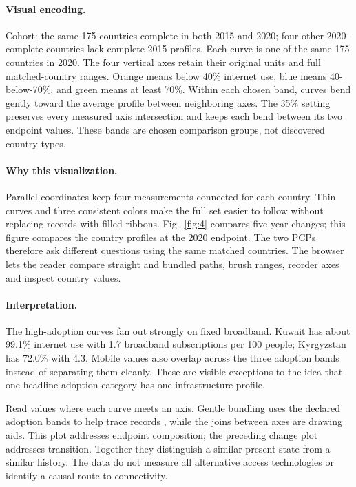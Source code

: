 \documentclass[conference,a4paper]{IEEEtran}
\begin{document}
\paragraph{Visual encoding.} Cohort: the same 175 countries complete in both 2015 and 2020; four other 2020-complete countries lack complete 2015 profiles. Each curve is one of the same 175 countries in 2020. The four vertical axes retain their original units and full matched-country ranges. Orange means below 40\% internet use, blue means 40-below-70\%, and green means at least 70\%. Within each chosen band, curves bend gently toward the average profile between neighboring axes. The 35\% setting preserves every measured axis intersection and keeps each bend between its two endpoint values. These bands are chosen comparison groups, not discovered country types.



\paragraph{Why this visualization.} Parallel coordinates keep four measurements connected for each country. Thin curves and three consistent colors make the full set easier to follow without replacing records with filled ribbons. Fig.~\ref{fig:4} compares five-year changes; this figure compares the country profiles at the 2020 endpoint. The two PCPs therefore ask different questions using the same matched countries. The browser lets the reader compare straight and bundled paths, brush ranges, reorder axes and inspect country values.



\paragraph{Interpretation.} The high-adoption curves fan out strongly on fixed broadband. Kuwait has about 99.1\% internet use with 1.7 broadband subscriptions per 100 people; Kyrgyzstan has 72.0\% with 4.3. Mobile values also overlap across the three adoption bands instead of separating them cleanly. These are visible exceptions to the idea that one headline adoption category has one infrastructure profile.

Read values where each curve meets an axis. Gentle bundling uses the declared adoption bands to help trace records \cite{ref10}, while the joins between axes are drawing aids. This plot addresses endpoint composition; the preceding change plot addresses transition. Together they distinguish a similar present state from a similar history. The data do not measure all alternative access technologies or identify a causal route to connectivity.
\end{document}
